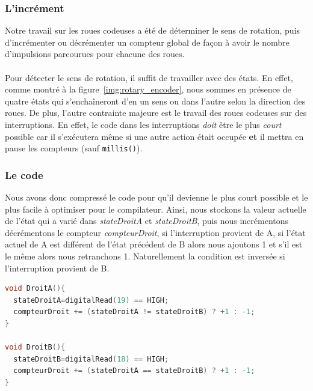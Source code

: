 \subsubsection{L'incrément}
Notre travail sur les roues codeuses a été de déterminer le sens de rotation, puis d'incrémenter ou décrémenter un compteur global de façon à avoir le nombre d'impulsions parcourues pour chacune des roues. 

\paragraph{}
Pour détecter le sens de rotation, il suffit de travailler avec des états. En effet, comme montré à la figure~\ref{img:rotary_encoder}, nous sommes en présence de quatre états qui s'enchaîneront d'en un sens ou dans l'autre selon la direction des roues. De plus, l'autre contrainte majeure est le travail des roues codeuses sur des interruptions. En effet, le code dans les interruptions \emph{doit} être le plus \emph{court} possible car il s'exécutera même si une autre action était occupée \textbf{et} il mettra en pause les compteurs (sauf \lstinline$millis()$). 

\subsubsection{Le code}
Nous avons donc compressé le code pour qu'il devienne le plus court possible et le plus facile à optimiser pour le compilateur. Ainsi, nous stockons la valeur actuelle de l'état qui a varié dans \textit{stateDroitA} et \textit{stateDroitB}, puis nous incrémentons décrémentons le compteur \textit{compteurDroit}, si l'interruption provient de A, si l'état actuel de A est différent de l'état précédent de B alors nous ajoutons 1 et s'il est le même alors nous retranchons 1. Naturellement la condition est inversée si l'interruption provient de B.

\begin{lstlisting}[language=C++,frame=tblr,keywordstyle=\bfseries]
void DroitA(){
  stateDroitA=digitalRead(19) == HIGH;
  compteurDroit += (stateDroitA != stateDroitB) ? +1 : -1;
}

void DroitB(){
  stateDroitB=digitalRead(18) == HIGH;
  compteurDroit += (stateDroitA == stateDroitB) ? +1 : -1;
}
\end{lstlisting}

